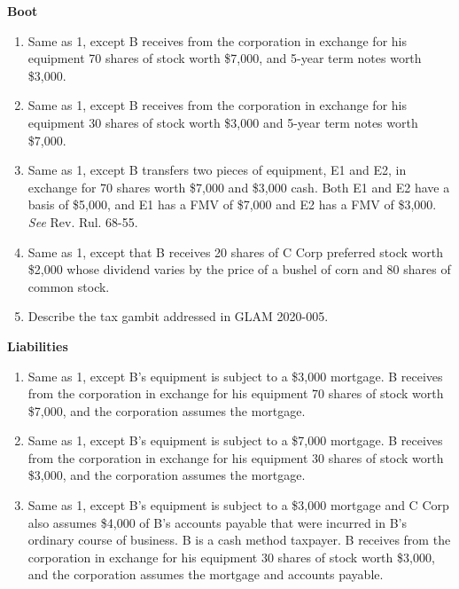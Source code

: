\documentclass[12pt]{article}
\begin{document}
 \textbf{Boot}
	\begin{enumerate}[resume]
		\item 
			Same as 1, except B receives from the corporation in exchange for his equipment 70 shares of stock worth \$7,000, and 5-year term notes worth \$3,000.
	
		\item
			Same as 1, except B receives from the corporation in exchange for his equipment 30 shares of stock worth \$3,000 and 5-year term notes worth \$7,000.	
		
		\item  
				Same as 1, except B transfers two pieces of equipment, E1 and E2, in exchange for 70 shares worth \$7,000 and \$3,000 cash.  Both E1 and E2 have a basis of \$5,000, and E1 has a FMV of \$7,000 and E2 has a FMV of \$3,000.  \emph{See} Rev. Rul. 68-55.
				
		\item 
			Same as 1, except that B receives 20 shares of C Corp preferred stock worth \$2,000 whose dividend varies by the price of a bushel of corn and 80 shares of common stock.
			
		\item
			Describe the tax gambit addressed in GLAM  2020-005.
	\end{enumerate}
	


	\textbf{Liabilities}
	
	\begin{enumerate}[resume]
		
		\item Same as 1, except B's equipment is subject to a \$3,000 mortgage. B receives from the corporation in exchange for his equipment 70 shares of stock worth \$7,000, and the corporation assumes the mortgage.
		
		\item 	Same as 1, except B's equipment is subject to a \$7,000 mortgage. B receives from the corporation in exchange for his equipment 30 shares of stock worth \$3,000, and the corporation assumes the mortgage.

		\item Same as 1, except B's equipment is subject to a \$3,000 mortgage and C Corp also assumes \$4,000 of B's accounts payable that were incurred in B's ordinary course of business.  B is a cash method taxpayer.  B receives from the corporation in exchange for his equipment 30 shares of stock worth \$3,000, and the corporation assumes the mortgage and accounts payable.


	\end{enumerate}
	
	






	
\end{document}
